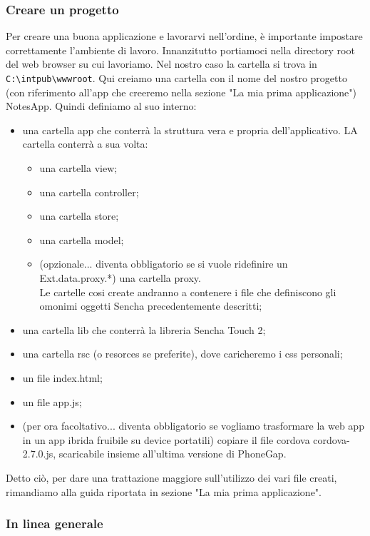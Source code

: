 \documentclass[10pt,a4paper,onecolumn]{article}
\begin{document}
\subsubsection{Creare un progetto}

Per creare una buona applicazione e lavorarvi nell'ordine, è importante impostare correttamente l'ambiente di lavoro. Innanzitutto portiamoci nella directory root del web browser su cui lavoriamo. Nel nostro caso la cartella si trova in \verb|C:\intpub\wwwroot|. Qui creiamo una cartella con il nome del nostro progetto (con riferimento all'app che creeremo nella sezione "La mia prima applicazione") NotesApp. Quindi definiamo al suo interno:

\begin{itemize}
	\item una cartella app che conterrà la struttura vera e propria dell'applicativo. LA cartella conterrà a sua volta:
	\begin{itemize}
		\item una cartella view;
		\item una cartella controller;
		\item una cartella store;
		\item una cartella model;
		\item (opzionale... diventa obbligatorio se si vuole ridefinire un Ext.data.proxy.*) una cartella proxy.\\
		
		Le cartelle cosi create andranno a contenere i file che definiscono gli omonimi oggetti Sencha precedentemente descritti;
	\end{itemize}
	\item una cartella lib che conterrà la libreria Sencha Touch 2;
	\item una cartella rsc (o resorces se preferite), dove caricheremo i css personali;
	\item un file index.html;
	\item un file app.js;
	\item (per ora facoltativo... diventa obbligatorio se vogliamo trasformare la web app in un app ibrida fruibile su device portatili) copiare il file cordova cordova-2.7.0.js, scaricabile insieme all'ultima versione di PhoneGap.
\end{itemize}

Detto ciò, per dare una trattazione maggiore sull'utilizzo dei vari file creati, rimandiamo alla guida riportata in sezione "La mia prima applicazione".

\subsubsection{In linea generale}
\end{document}
